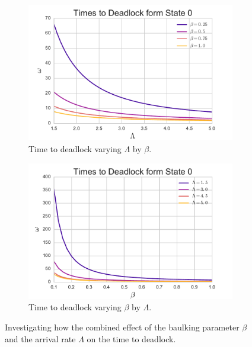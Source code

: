 \documentclass{article}
\begin{document}
\begin{figure}[!hbtp]
\begin{center}
\begin{subfigure}[b]{0.45\textwidth}
    \includegraphics[width=\textwidth]{img/varylambda_bybeta.pdf}
    \caption{Time to deadlock varying $\Lambda$ by $\beta$.}
    \label{fig:varyLambdabybeta}
\end{subfigure}
\begin{subfigure}[b]{0.45\textwidth}
    \includegraphics[width=\textwidth]{img/varybeta_bylambda.pdf}
    \caption{Time to deadlock varying $\beta$ by $\Lambda$.}
    \label{fig:varybetabyLambda}
\end{subfigure}
\end{center}
\caption{Investigating how the combined effect of the baulking parameter $\beta$ and the arrival rate $\Lambda$ on the time to deadlock.}
\label{fig:combinedeffect_betalambda}
\end{figure}
\end{document}
